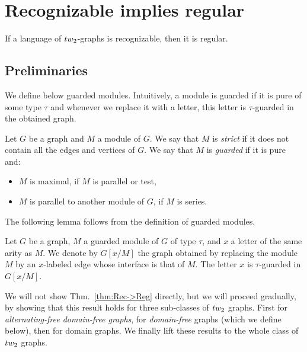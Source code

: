 \section{Recognizable implies regular}\label{sec:rec->reg}


\begin{theorem}\label{thm:Rec->Reg}
If a language of $\TWT$-graphs is recognizable, then it is regular.
\end{theorem}

 

\subsection{Preliminaries}

We define below guarded modules. Intuitively, a module is guarded if it is pure of some type $\tau$ and whenever we replace it with a letter, this  letter is $\tau$-guarded in the obtained graph.
\begin{definition}
Let $G$ be a graph and $M$ a module of $G$.
 We say that $M$ is \emph{strict} if it does not contain all the edges and vertices of $G$.
 We say that $M$ is \emph{guarded} if it is pure and:
\begin{itemize}
\item   $M$ is maximal, if $M$ is parallel or test,
\item $M$ is parallel to another module of $G$, if $M$ is series.
\end{itemize}
\end{definition}

The following lemma follows from the definition of guarded modules. 

\begin{lemma}\label{lem:meaning-of-guared-module}
Let $G$ be a graph, $M$ a guarded module of $G$ of type $\tau$, and  $x$ a letter of the same arity as $M$. We denote by $G[x/M]$ the graph obtained by replacing the module $M$ by an $x$-labeled edge whose interface is that of $M$.  
The letter $x$ is $\tau$-guarded in $G[x/M]$.
\end{lemma}





We will not show Thm.~\ref{thm:Rec->Reg} directly, but we will proceed gradually, by showing that this result holds for three sub-classes of $\TWT$ graphs. First for \emph{alternating-free domain-free graphs}, for \emph{domain-free} graphs (which we define below), then for domain graphs. We finally lift these results to the whole class of $\TWT$ graphs. 

